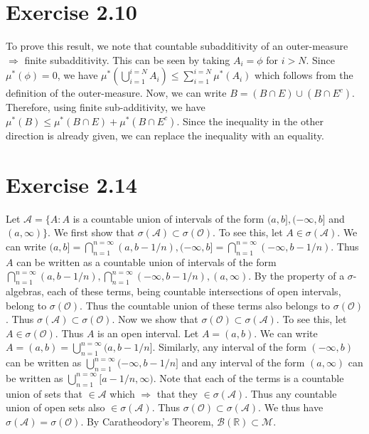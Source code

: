 \documentclass{article}
\begin{document}
  \section*{Exercise 2.10}
    To prove this result, we note that countable subadditivity of an outer-measure $\Rightarrow$ finite subadditivity. This can be seen by taking $A_i = \phi$ for $i > N$. Since $\mu^*(\phi)= 0$, we have
    $\mu^*(\bigcup_{i=1}^{i=N}A_i) \le \sum_{i=1}^{i=N}\mu^*(A_i)$ which follows from the definition of the outer-measure.
    \newline
    Now, we can write $B = (B \cap E) \cup (B \cap E^c)$. Therefore, using finite sub-additivity, we have $\mu^*(B) \le \mu^*(B \cap E) + \mu^*(B \cap E^c)$. Since the inequality in the other direction
    is already given, we can replace the inequality with an equality.

  \section*{Exercise 2.14}
    Let $\mathcal A = \{A: A$ is a countable union of intervals of the form $(a,b], (-\infty, b]$ and $(a, \infty)\}$. We first show that $\sigma(\mathcal A) \subset \sigma(\mathcal O)$. To see this,
    let $A \in \sigma(\mathcal A)$. We can write $(a,b] = \bigcap_{n=1}^{n=\infty}(a, b - 1/n), (- \infty, b] = \bigcap_{n=1}^{n=\infty}(-\infty, b- 1/n)$. Thus $A$ can be written as a countable union of
    intervals of the form $\bigcap_{n=1}^{n=\infty}(a, b-1/n), \bigcap_{n=1}^{n=\infty}(-\infty, b-1/n), (a, \infty)$. By the property of a $\sigma$- algebras, each of these terms, being countable intersections of
    open intervals, belong to $\sigma(\mathcal O)$. Thus the countable union of these terms also belongs to $\sigma(\mathcal O)$. Thus $\sigma(\mathcal A) \subset \sigma(\mathcal O)$.
    \newline
    Now we show that $\sigma(\mathcal O) \subset \sigma(\mathcal A)$. To see this, let $A \in \sigma(\mathcal O)$. Thus $A$ is an open interval. Let $A = (a,b)$. We can write $A = (a,b) = \bigcup_{n=1}^{n=\infty}(a, b-1/n]$. Similarly,
    any interval of the form $(-\infty, b)$ can be written as $\bigcup_{n=1}^{n=\infty}(-\infty, b-1/n]$ and any interval of the form $(a, \infty)$ can be written as $\bigcup_{n=1}^{n=\infty}[a-1/n, \infty)$.
    Note that each of the terms is a countable union of sets that $\in \mathcal A$ which $\Rightarrow$ that they $\in \sigma(\mathcal A)$. Thus any countable union of open sets also $\in \sigma(\mathcal A)$.
    Thus $\sigma(\mathcal O) \subset \sigma(\mathcal A)$.
    \newline
    We thus have $\sigma(\mathcal A) = \sigma(\mathcal O)$. By Caratheodory's Theorem, $\mathcal B(\mathbb R) \subset \mathcal M$.

  
\end{document}
